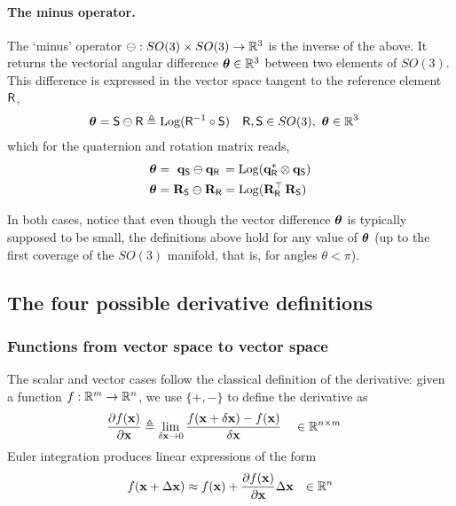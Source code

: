 \paragraph{The minus operator.}
The `minus' operator $\ominus:SO(3)\times SO(3)\to{\mathbb R}^3$ is the inverse of the above. It returns the vectorial angular difference ${{\bm \theta}}\in{\mathbb R}^3$ between two elements of $SO(3)$. This difference is expressed in the  vector space tangent to the reference element $\mathsf R$, 
%
\begin{align}
{{\bm \theta}}=\mathsf S\ominus \mathsf R
&\triangleq \operatorname*{Log}(\mathsf R^{-1} \circ \mathsf S)     && \mathsf R,\mathsf S\in SO(3),~ {{\bm \theta}}\in{\mathbb R}^3  
\end{align}
%
which for the quaternion and rotation matrix reads,
%
\begin{align}
{{\bm \theta}} &= \,\,{\bf q}_\mathsf S\ominus{\bf q}_\mathsf R\, = \operatorname*{Log}({\bf q}_\mathsf R^*\otimes{\bf q}_\mathsf S)                      \\
{{\bm \theta}} &= {\bf R}_\mathsf S\ominus{\bf R}_\mathsf R = \operatorname*{Log}({\bf R}_\mathsf R^{\top}\,{\bf R}_\mathsf S)                         
\end{align}

\bigskip
In both cases, notice that even though the vector difference ${\bm \theta}$ is typically supposed to be small, the definitions above hold for any value of ${\bm \theta}$ (up to the first coverage of the $SO(3)$ manifold, that is, for angles $\theta<\pi$).

\subsection{The four possible derivative definitions}



\subsubsection{Functions from vector space to vector space}

The scalar and vector cases follow the classical definition of the derivative: given a function $f:{\mathbb R}^m\to{\mathbb R}^n$, we use $\{+,-\}$ to define the derivative as
%
\begin{align}
\frac{\partial f({\bf x})}{\partial{\bf x}} &\triangleq \lim_{\delta{\bf x}\to0}\frac{f({\bf x}+\delta{\bf x})-f({\bf x})}{\delta{\bf x}} &&\in {\mathbb R}^{n\times m} \label{equ:derivative_vector}
\end{align}
%
Euler integration produces linear expressions of the form
%
\begin{align*}
f({\bf x}+\Delta{\bf x}) &\approx f({\bf x}) + \frac{\partial f({\bf x})}{\partial{\bf x}}\Delta{\bf x}
& \in {\mathbb R}^n
\end{align*}

